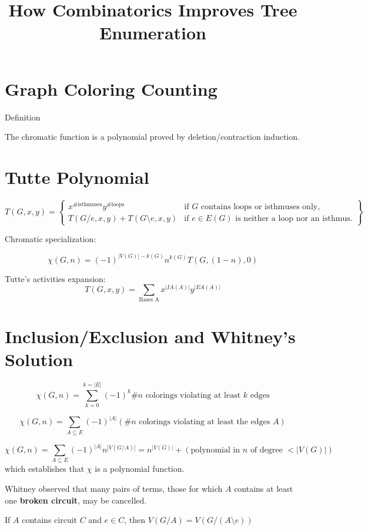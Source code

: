 \documentclass{article}
\title{How Combinatorics Improves Tree Enumeration}
\begin{document}
\maketitle

\section{Graph Coloring Counting}

Definition

The chromatic function is a polynomial proved by deletion/contraction
induction.

\section{Tutte Polynomial}

\[
T(G,x,y) = \left\{ \begin{array}{ll}
  x^{\text{\# isthmuses}}y^{\text{\# loops}} & \text{if }G\text{ contains loops or isthmuses only,}\\
  T(G/e,x,y)+T(G\setminus e,x,y) & \text{if }e\in E(G)
     \text{ is neither a loop nor an isthmus.}
  \end{array}
  \right\}
\]

Chromatic specialization:

\[
\chi(G,n) = (-1)^{|V(G)|-k(G)}n^{k(G)}T(G,(1-n),0)
\]

Tutte's activities expansion:
\[
T(G,x,y) = \sum_{\text{Bases A}}x^{|IA(A)|}y^{|EA(A)|}
\]


\section{Inclusion/Exclusion and Whitney's Solution}

\[
\chi(G,n) = \sum_{k=0}^{k=|E|}(-1)^k \text{\# }n\text{ colorings violating at least }
k\text{ edges}
\]

\[
\chi(G,n) = \sum_{A\subseteq E}(-1)^{|A|} 
(\text{\# }n\text{ colorings violating at least the edges }A)
\]

\[
\chi(G,n) = \sum_{A\subseteq E}(-1)^{|A|}
n^{|V(G/A)|} = n^{|V(G)|} + (\text{polynomial in } n \text{ of degree } < |V(G)|)
\]
which establishes that $\chi$ is a polynomial function.  

Whitney\cite{WhitLogExpMath} observed that 
many pairs of terms, those for which $A$ contains at least 
one \textbf{broken circuit}, may be cancelled.

If $A$ contains circuit $C$ and $e\in C$, then $V(G/A) = V(G/(A\setminus e))$
\end{document}
